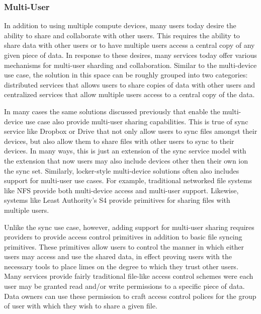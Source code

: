 \subsubsection{Multi-User}

In addition to using multiple compute devices, many users today desire
the ability to share and collaborate with other users. This requires
the ability to share data with other users or to have multiple users
access a central copy of any given piece of data. In response to these
desires, many services today offer various mechanisms for multi-user
sharding and collaboration. Similar to the multi-device use case, the
solution in this space can be roughly grouped into two categories:
distributed services that allows users to share copies of data with
other users and centralized services that allow multiple users access
to a central copy of the data.

In many cases the same solutions discussed previously that enable the
multi-device use case also provide multi-user sharing
capabilities. This is true of sync service like Dropbox or Drive that
not only allow users to sync files amongst their devices, but also
allow them to share files with other users to sync to their
devices. In many ways, this is just an extension of the sync service
model with the extension that now users may also include devices other
then their own ion the sync set. Similarly, locker-style multi-device
solutions often also includes support for multi-user use cases. For
example, traditional networked file systems like NFS provide both
multi-device access and multi-user support. Likewise, systems like
Least Authority's S4 provide primitives for sharing files with
multiple users.

Unlike the sync use case, however, adding support for multi-user
sharing requires providers to provide access control primitives in
addition to basic file syncing primitives. These primitives allow
users to control the manner in which either users may access and use
the shared data, in effect proving users with the necessary tools to
place limes on the degree to which they trust other users. Many
services provide fairly traditional file-like access control schemes
were each user may be granted read and/or write permissions to a
specific piece of data. Data owners can use these permission to craft
access control polices for the group of user with which they wish to
share a given file.

